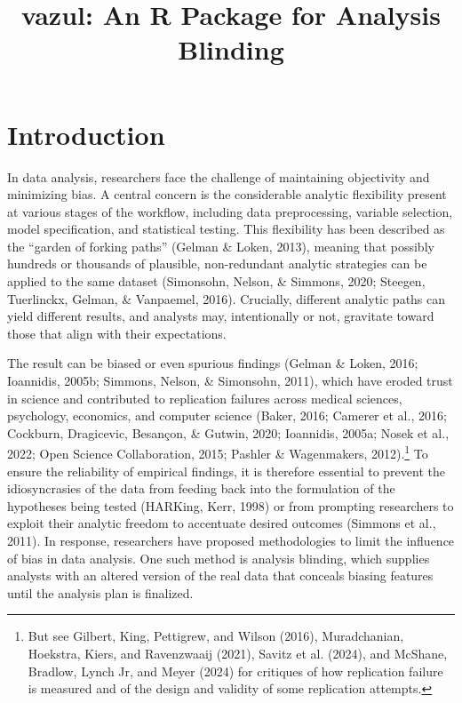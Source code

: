 \documentclass[
  english,
  man,floatsintext]{apa6}
\title{vazul: An R Package for Analysis Blinding}
\author{\phantom{0}}
\date{}
\affiliation{\phantom{0}}
\begin{document}
\maketitle

\section{Introduction}\label{introduction}

In data analysis, researchers face the challenge of maintaining objectivity and minimizing bias. A central concern is the considerable analytic flexibility present at various stages of the workflow, including data preprocessing, variable selection, model specification, and statistical testing. This flexibility has been described as the ``garden of forking paths'' (Gelman \& Loken, 2013), meaning that possibly hundreds or thousands of plausible, non-redundant analytic strategies can be applied to the same dataset (Simonsohn, Nelson, \& Simmons, 2020; Steegen, Tuerlinckx, Gelman, \& Vanpaemel, 2016). Crucially, different analytic paths can yield different results, and analysts may, intentionally or not, gravitate toward those that align with their expectations.

The result can be biased or even spurious findings (Gelman \& Loken, 2016; Ioannidis, 2005b; Simmons, Nelson, \& Simonsohn, 2011), which have eroded trust in science and contributed to replication failures across medical sciences, psychology, economics, and computer science (Baker, 2016; {Camerer et al.}, 2016; Cockburn, Dragicevic, Besançon, \& Gutwin, 2020; Ioannidis, 2005a; {Nosek et al.}, 2022; Open Science Collaboration, 2015; Pashler \& Wagenmakers, 2012).\footnote{But see Gilbert, King, Pettigrew, and Wilson (2016), Muradchanian, Hoekstra, Kiers, and Ravenzwaaij (2021), Savitz et al. (2024), and McShane, Bradlow, Lynch Jr, and Meyer (2024) for critiques of how replication failure is measured and of the design and validity of some replication attempts.} To ensure the reliability of empirical findings, it is therefore essential to prevent the idiosyncrasies of the data from feeding back into the formulation of the hypotheses being tested (HARKing, Kerr, 1998) or from prompting researchers to exploit their analytic freedom to accentuate desired outcomes (Simmons et al., 2011). In response, researchers have proposed methodologies to limit the influence of bias in data analysis. One such method is analysis blinding, which supplies analysts with an altered version of the real data that conceals biasing features until the analysis plan is finalized.
\end{document}
